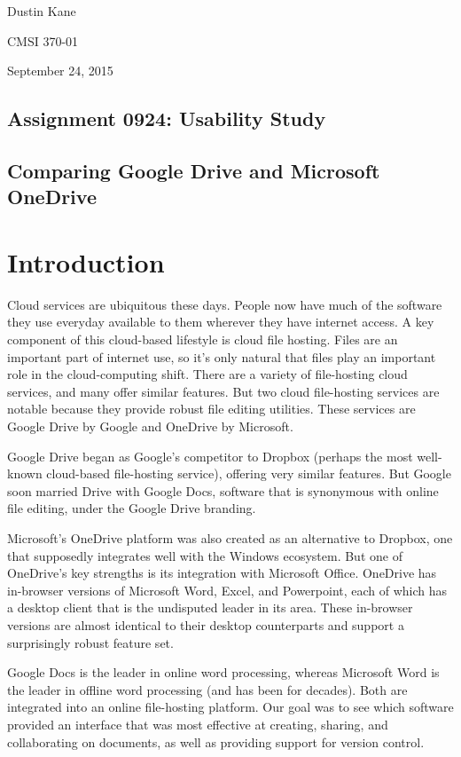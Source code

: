 \documentclass[a4paper,12pt]{article}
\begin{document}
Dustin Kane

CMSI 370-01

September 24, 2015

\begin{center}
\section*{Assignment 0924: Usability Study}
\subsection*{Comparing Google Drive and Microsoft OneDrive}
\end{center}

\section{Introduction}

Cloud services are ubiquitous these days. People now have much of the software they use everyday available to them wherever they have internet access. A key component of this cloud-based lifestyle is cloud file hosting. Files are an important part of internet use, so it's only natural that files play an important role in the cloud-computing shift. There are a variety of file-hosting cloud services, and many offer similar features. But two cloud file-hosting services are notable because they provide robust file editing utilities. These services are Google Drive by Google and OneDrive by Microsoft. 

Google Drive began as Google's competitor to Dropbox (perhaps the most well-known cloud-based file-hosting service), offering very similar features. But Google soon married Drive with Google Docs, software that is synonymous with online file editing, under the Google Drive branding.

Microsoft's OneDrive platform was also created as an alternative to Dropbox, one that supposedly integrates well with the Windows ecosystem. But one of OneDrive's key strengths is its integration with Microsoft Office. OneDrive has in-browser versions of Microsoft Word, Excel, and Powerpoint, each of which has a desktop client that is the undisputed leader in its area. These in-browser versions are almost identical to their desktop counterparts and support a surprisingly robust feature set.

Google Docs is the leader in online word processing, whereas Microsoft Word is the leader in offline word processing (and has been for decades). Both are integrated into an online file-hosting platform. Our goal was to see which software provided an interface that was most effective at creating, sharing, and collaborating on documents, as well as providing support for version control.
\end{document}
